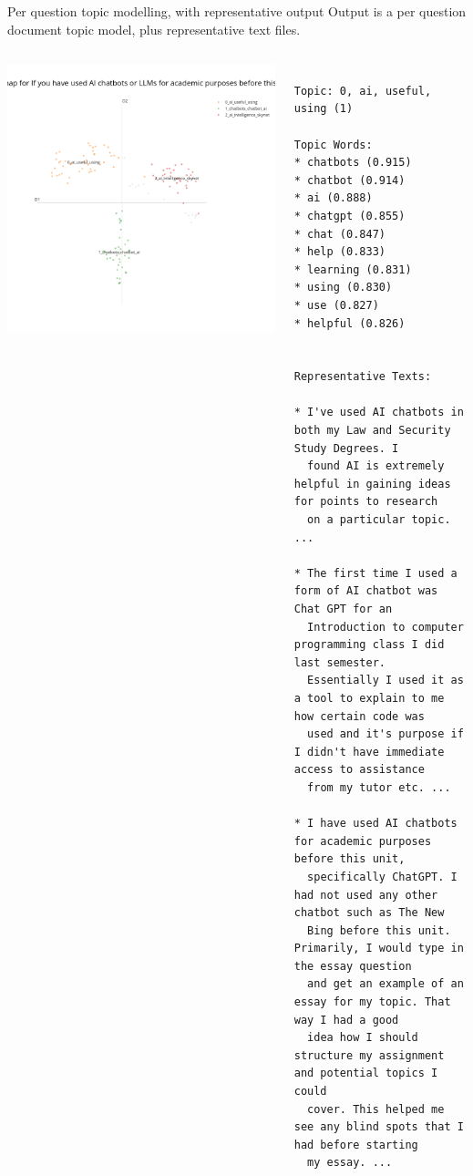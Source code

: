 \documentclass[xcolor={dvipsnames},aspectratio=169]{beamer}
\begin{document}
\begin{frame}{Per question topic modelling, with representative output}
    Output is a per question document topic model, plus representative text files.

    \begin{columns}

\includegraphics[width=\textwidth]{newplot (1).png}
\tiny
\begin{verbatim}

Topic: 0, ai, useful, using (1)

Topic Words: 
* chatbots (0.915)
* chatbot (0.914)
* ai (0.888)
* chatgpt (0.855)
* chat (0.847)
* help (0.833)
* learning (0.831)
* using (0.830)
* use (0.827)
* helpful (0.826)


Representative Texts:

* I've used AI chatbots in both my Law and Security Study Degrees. I
  found AI is extremely helpful in gaining ideas for points to research
  on a particular topic.  ...

* The first time I used a form of AI chatbot was Chat GPT for an
  Introduction to computer programming class I did last semester.
  Essentially I used it as a tool to explain to me how certain code was
  used and it's purpose if I didn't have immediate access to assistance
  from my tutor etc. ...

* I have used AI chatbots for academic purposes before this unit,
  specifically ChatGPT. I had not used any other chatbot such as The New
  Bing before this unit. Primarily, I would type in the essay question
  and get an example of an essay for my topic. That way I had a good
  idea how I should structure my assignment and potential topics I could
  cover. This helped me see any blind spots that I had before starting
  my essay. ... 
\end{verbatim}
\end{columns}
\end{frame}
\end{document}
